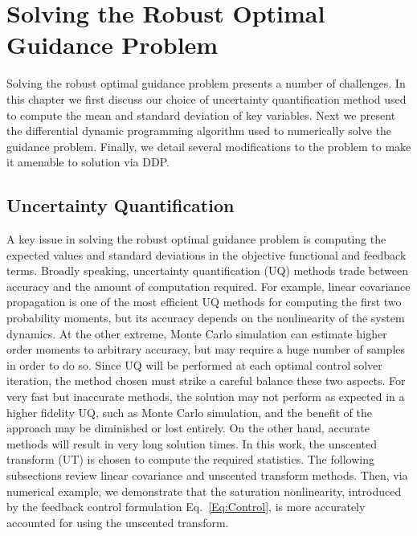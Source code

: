 \chapter{Solving the Robust Optimal Guidance Problem}\label{Ch:SolutionMethod}

Solving the robust optimal guidance problem presents a number of challenges. In this chapter we first discuss our choice of uncertainty quantification method used to compute the mean and standard deviation of key variables. Next we present the differential dynamic programming algorithm used to numerically solve the guidance problem. Finally, we detail several modifications to the problem to make it amenable to solution via DDP.

\section{Uncertainty Quantification}\label{Sec:UQ}
A key issue in solving the robust optimal guidance problem is computing the expected values and standard deviations in the objective functional and feedback terms. Broadly speaking, uncertainty quantification (UQ) methods trade between accuracy and the amount of computation required. For example, linear covariance propagation is one of the most efficient UQ methods for computing the first two probability moments, but its accuracy depends on the nonlinearity of the system dynamics. At the other extreme, Monte Carlo simulation can estimate higher order moments to arbitrary accuracy, but may require a huge number of samples in order to do so. Since UQ will be performed at each optimal control solver iteration, the method chosen must strike a careful balance these two aspects. For very fast but inaccurate methods, the solution may not perform as expected in a higher fidelity UQ, such as Monte Carlo simulation, and the benefit of the approach may be diminished or lost entirely. On the other hand, accurate methods will result in very long solution times. In this work, the unscented transform (UT) \cite{UT1997} is chosen to compute the required statistics. The following subsections review linear covariance and unscented transform methods. Then, via numerical example, we demonstrate that the saturation nonlinearity, introduced by the feedback control formulation Eq.~\eqref{Eq:Control}, is more accurately accounted for using the unscented transform. 

